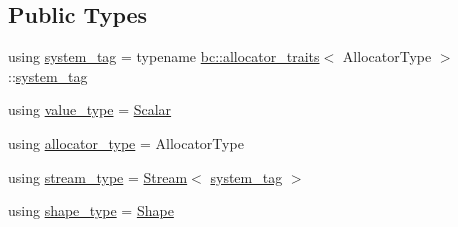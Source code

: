 \subsection*{Public Types}
\begin{DoxyCompactItemize}
\item 
using \hyperlink{structbc_1_1tensors_1_1exprs_1_1Array_a116ffe7734f63cf0ca63b32b7cfb0506}{system\+\_\+tag} = typename \hyperlink{structbc_1_1allocators_1_1allocator__traits}{bc\+::allocator\+\_\+traits}$<$ Allocator\+Type $>$\+::\hyperlink{structbc_1_1tensors_1_1exprs_1_1Array_a116ffe7734f63cf0ca63b32b7cfb0506}{system\+\_\+tag}
\item 
using \hyperlink{structbc_1_1tensors_1_1exprs_1_1Array_a28b34dfcad3f0d35770d64a38f7187a0}{value\+\_\+type} = \hyperlink{namespacebc_aa12ac55ee2c43dc082894dd3859daee1}{Scalar}
\item 
using \hyperlink{structbc_1_1tensors_1_1exprs_1_1Array_a990afcebe8817075d427f2653d197140}{allocator\+\_\+type} = Allocator\+Type
\item 
using \hyperlink{structbc_1_1tensors_1_1exprs_1_1Array_aba97273ba94fb140763e7db5da630ea0}{stream\+\_\+type} = \hyperlink{classbc_1_1streams_1_1Stream}{Stream}$<$ \hyperlink{structbc_1_1tensors_1_1exprs_1_1Array_a116ffe7734f63cf0ca63b32b7cfb0506}{system\+\_\+tag} $>$
\item 
using \hyperlink{structbc_1_1tensors_1_1exprs_1_1Array_a67c96ea64a2899ba0593a6b81aa0868e}{shape\+\_\+type} = \hyperlink{structbc_1_1Shape}{Shape}
\end{DoxyCompactItemize}
